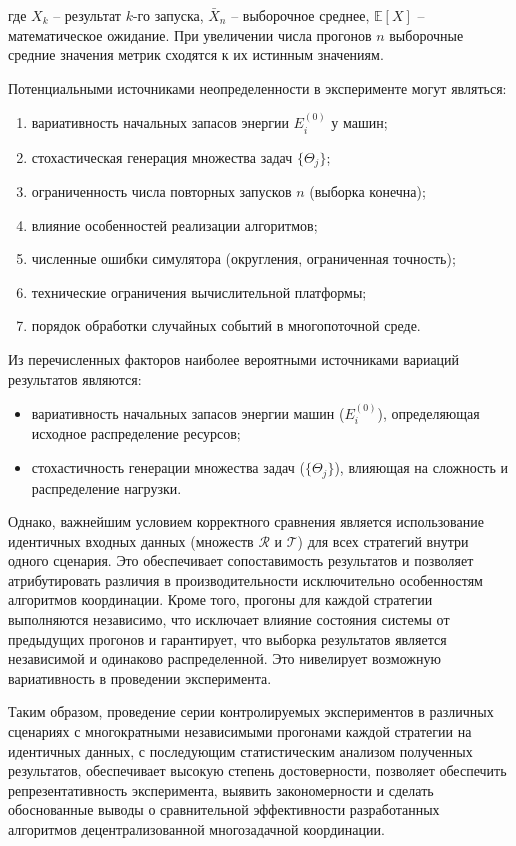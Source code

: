 где $X_k$ -- результат $k$-го запуска, $\bar{X}_n$ -- выборочное среднее, $\mathbb{E}[X]$ -- математическое ожидание. При увеличении числа прогонов $n$ выборочные средние значения метрик сходятся к их истинным значениям.

Потенциальными источниками неопределенности в эксперименте могут являться:
\begin{enumerate}[beginpenalty=10000, midpenalty=10000, wide=\parindent, leftmargin=0pt]
	\item вариативность начальных запасов энергии $E_i^{(0)}$ у машин;
	\item стохастическая генерация множества задач $\{\Theta_j\}$;
	\item ограниченность числа повторных запусков $n$ (выборка конечна);
	\item влияние особенностей реализации алгоритмов;
	\item численные ошибки симулятора (округления, ограниченная точность);
	\item технические ограничения вычислительной платформы;
	\item порядок обработки случайных событий в многопоточной среде.
\end{enumerate}

Из перечисленных факторов наиболее вероятными источниками вариаций результатов являются:
\begin{itemize}[beginpenalty=10000, midpenalty=10000, wide=\parindent, leftmargin=0pt]
	\item вариативность начальных запасов энергии машин ($E_i^{(0)}$), определяющая исходное распределение ресурсов;
	\item стохастичность генерации множества задач ($\{\Theta_j\}$), влияющая на сложность и распределение нагрузки.
\end{itemize}

Однако, важнейшим условием корректного сравнения является использование идентичных входных данных (множеств $\mathcal{R}$ и $\mathcal{T}$) для всех стратегий внутри одного сценария. Это обеспечивает сопоставимость результатов и позволяет атрибутировать различия в производительности исключительно особенностям алгоритмов координации. Кроме того, прогоны для каждой стратегии выполняются независимо, что исключает влияние состояния системы от предыдущих прогонов и гарантирует, что выборка результатов является независимой и одинаково распределенной. Это нивелирует возможную вариативность в проведении эксперимента.

Таким образом, проведение серии контролируемых экспериментов в различных сценариях с многократными независимыми прогонами каждой стратегии на идентичных данных, с последующим статистическим анализом полученных результатов, обеспечивает высокую степень достоверности, позволяет обеспечить репрезентативность эксперимента, выявить закономерности и сделать обоснованные выводы о сравнительной эффективности разработанных алгоритмов децентрализованной многозадачной координации.

